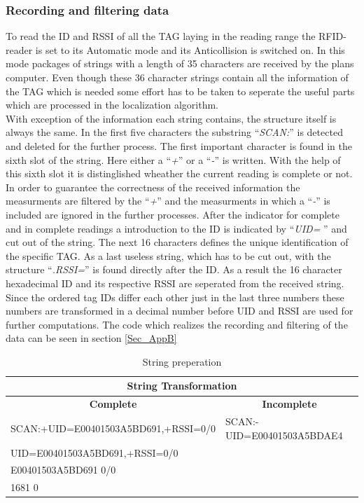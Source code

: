 \subsubsection{Recording and filtering data}
To read the ID and RSSI of all the TAG laying in the reading range the RFID-reader is set to its Automatic mode and its Anticollision is switched on. In this mode packages of strings with a length of 35 characters are received by the plans computer. Even though these 36 character strings contain all the information of the TAG which is needed some effort has to be taken to seperate the useful parts which are processed in the localization algorithm.\\
With exception of the information each string contains, the structure itself is always the same. In the first five characters the substring ``\textit{SCAN:}'' is detected and deleted for the further process. The first important character is found in the sixth slot of the string. Here either a ``\textit{+}'' or a ``\textit{-}'' is written. With the help of this sixth slot it is distinglished wheather the current reading is complete or not. In order to guarantee the correctness of the received information the measurments are filtered by the ``\textit{+}'' and the measurments in which a ``\textit{-}'' is included are ignored in the further processes. After the indicator for complete and in complete readings a introduction to the ID is indicated by  ``\textit{UID=} '' and cut out of the string. The next 16 characters defines the unique identification of the specific TAG. As a last useless string, which has to be cut out, with the structure ``\textit{.RSSI=}'' is found directly after the ID. As a result the 16 character hexadecimal ID and its respective RSSI are seperated from the received string. Since the ordered tag IDs differ each other just in the last three numbers these numbers are transformed in a decimal number before UID and RSSI are used for further computations. The code which realizes the recording and filtering of the data can be seen in section \ref{Sec_AppB}\\
\begin{table}[!htbp]
\centering
\begin{tabular}{|l|l|}
\hline
\multicolumn{2}{|c|}{\textbf{String Transformation}}                               \\ \hline
\multicolumn{1}{|c|}{\textbf{Complete}} & \multicolumn{1}{c|}{\textbf{Incomplete}} \\ \hline
SCAN:+UID=E00401503A5BD691,+RSSI=0/0    & SCAN:-UID=E00401503A5BDAE4               \\ \hline
UID=E00401503A5BD691,+RSSI=0/0          &                                          \\ \hline
E00401503A5BD691 0/0                    &                                          \\ \hline
1681 0                                  &                                          \\ \hline
\end{tabular}
\caption{String preperation}
\label{string_prep}
\end{table}

